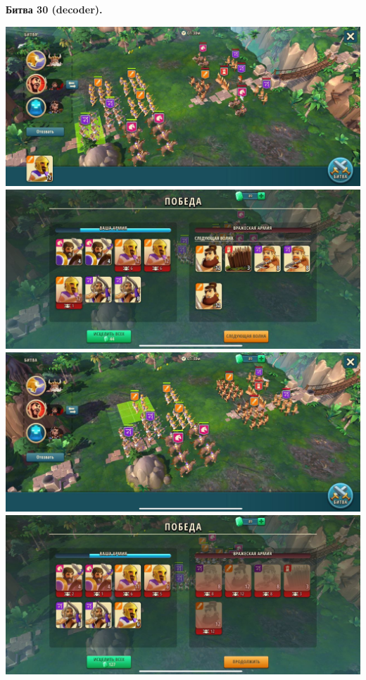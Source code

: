 \newpage
\begin{center}
	\hypertarget{fight30}{\textbf{Битва 30 (decoder).}}
\end{center}
\noindent\includegraphics[width=\linewidth]{./parts/media/TreasureHunt/30/decoder/photo_2022-04-07_09-59-28.jpg} \newline
\noindent\includegraphics[width=\linewidth]{./parts/media/TreasureHunt/30/decoder/photo_2022-04-07_09-59-40.jpg} \newline
\noindent\includegraphics[width=\linewidth]{./parts/media/TreasureHunt/30/decoder/photo_2022-04-07_10-00-22.jpg} \newline
\noindent\includegraphics[width=\linewidth]{./parts/media/TreasureHunt/30/decoder/photo_2022-04-07_10-00-32.jpg} \newline

